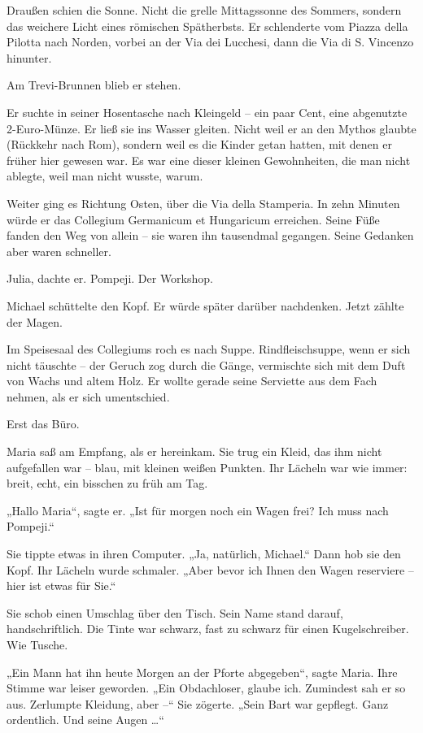 \documentclass[
]{article}
\begin{document}
Draußen schien die Sonne. Nicht die grelle Mittagssonne des Sommers, sondern das weichere Licht eines römischen Spätherbsts. Er schlenderte vom Piazza della Pilotta nach Norden, vorbei an der Via dei Lucchesi, dann die Via di S. Vincenzo hinunter.

Am Trevi-Brunnen blieb er stehen.

Er suchte in seiner Hosentasche nach Kleingeld -- ein paar Cent, eine abgenutzte 2-Euro-Münze. Er ließ sie ins Wasser gleiten. Nicht weil er an den Mythos glaubte (Rückkehr nach Rom), sondern weil es die Kinder getan hatten, mit denen er früher hier gewesen war. Es war eine dieser kleinen Gewohnheiten, die man nicht ablegte, weil man nicht wusste, warum.

Weiter ging es Richtung Osten, über die Via della Stamperia. In zehn Minuten würde er das Collegium Germanicum et Hungaricum erreichen. Seine Füße fanden den Weg von allein -- sie waren ihn tausendmal gegangen. Seine Gedanken aber waren schneller.

Julia, dachte er. Pompeji. Der Workshop.

Michael schüttelte den Kopf. Er würde später darüber nachdenken. Jetzt zählte der Magen.

Im Speisesaal des Collegiums roch es nach Suppe. Rindfleischsuppe, wenn er sich nicht täuschte -- der Geruch zog durch die Gänge, vermischte sich mit dem Duft von Wachs und altem Holz. Er wollte gerade seine Serviette aus dem Fach nehmen, als er sich umentschied.

Erst das Büro.

Maria saß am Empfang, als er hereinkam. Sie trug ein Kleid, das ihm nicht aufgefallen war -- blau, mit kleinen weißen Punkten. Ihr Lächeln war wie immer: breit, echt, ein bisschen zu früh am Tag.

„Hallo Maria``, sagte er. „Ist für morgen noch ein Wagen frei? Ich muss nach Pompeji.``

Sie tippte etwas in ihren Computer. „Ja, natürlich, Michael.`` Dann hob sie den Kopf. Ihr Lächeln wurde schmaler. „Aber bevor ich Ihnen den Wagen reserviere -- hier ist etwas für Sie.``

Sie schob einen Umschlag über den Tisch. Sein Name stand darauf, handschriftlich. Die Tinte war schwarz, fast zu schwarz für einen Kugelschreiber. Wie Tusche.

„Ein Mann hat ihn heute Morgen an der Pforte abgegeben``, sagte Maria. Ihre Stimme war leiser geworden. „Ein Obdachloser, glaube ich. Zumindest sah er so aus. Zerlumpte Kleidung, aber --`` Sie zögerte. „Sein Bart war gepflegt. Ganz ordentlich. Und seine Augen \ldots``
\end{document}
